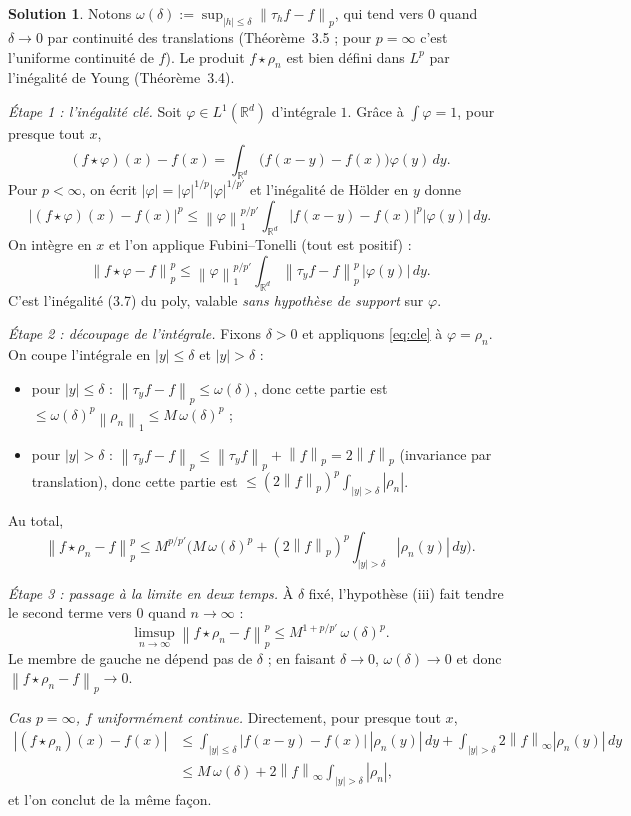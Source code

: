 \documentclass[11pt,a4paper]{article}
\newcommand{\R}{\mathbb{R}}
\newcommand{\norm}[1]{\left\|#1\right\|}
\theoremstyle{definition}
\newtheorem*{solution}{Solution}
\begin{document}
\begin{solution}
Notons $\omega(\delta):=\sup_{|h|\le\delta}\norm{\tau_hf-f}_p$, qui tend vers $0$ quand $\delta\to0$ par continuité des translations (Théorème~3.5 ; pour $p=\infty$ c'est l'uniforme continuité de $f$). Le produit $f\star\rho_n$ est bien défini dans $L^p$ par l'inégalité de Young (Théorème~3.4).

\emph{Étape 1 : l'inégalité clé.} Soit $\varphi\in L^1(\R^d)$ d'intégrale $1$. Grâce à $\int\varphi=1$, pour presque tout $x$,
\[
(f\star\varphi)(x)-f(x)=\int_{\R^d}\big(f(x-y)-f(x)\big)\varphi(y)\,dy .
\]
Pour $p<\infty$, on écrit $|\varphi|=|\varphi|^{1/p}|\varphi|^{1/p'}$ et l'inégalité de Hölder en $y$ donne
\[
\big|(f\star\varphi)(x)-f(x)\big|^p\le\norm\varphi_1^{p/p'}\int_{\R^d}\big|f(x-y)-f(x)\big|^p|\varphi(y)|\,dy .
\]
On intègre en $x$ et l'on applique Fubini--Tonelli (tout est positif) :
\begin{equation}\label{eq:cle}
\norm{f\star\varphi-f}_p^p\le\norm\varphi_1^{p/p'}\int_{\R^d}\norm{\tau_yf-f}_p^p\,|\varphi(y)|\,dy .
\end{equation}
C'est l'inégalité (3.7) du poly, valable \emph{sans hypothèse de support} sur $\varphi$.

\emph{Étape 2 : découpage de l'intégrale.} Fixons $\delta>0$ et appliquons \eqref{eq:cle} à $\varphi=\rho_n$. On coupe l'intégrale en $|y|\le\delta$ et $|y|>\delta$ :
\begin{itemize}
  \item pour $|y|\le\delta$ : $\norm{\tau_yf-f}_p\le\omega(\delta)$, donc cette partie est $\le\omega(\delta)^p\norm{\rho_n}_1\le M\,\omega(\delta)^p$ ;
  \item pour $|y|>\delta$ : $\norm{\tau_yf-f}_p\le\norm{\tau_yf}_p+\norm f_p=2\norm f_p$ (invariance par translation), donc cette partie est $\le(2\norm f_p)^p\int_{|y|>\delta}|\rho_n|$.
\end{itemize}
Au total,
\[
\norm{f\star\rho_n-f}_p^p\le M^{p/p'}\Big(M\,\omega(\delta)^p+(2\norm f_p)^p\int_{|y|>\delta}|\rho_n(y)|\,dy\Big).
\]

\emph{Étape 3 : passage à la limite en deux temps.} À $\delta$ fixé, l'hypothèse (iii) fait tendre le second terme vers $0$ quand $n\to\infty$ :
\[
\limsup_{n\to\infty}\norm{f\star\rho_n-f}_p^p\le M^{1+p/p'}\,\omega(\delta)^p .
\]
Le membre de gauche ne dépend pas de $\delta$ ; en faisant $\delta\to0$, $\omega(\delta)\to0$ et donc $\norm{f\star\rho_n-f}_p\to0$.

\emph{Cas $p=\infty$, $f$ uniformément continue.} Directement, pour presque tout $x$,
\begin{align*}
|(f\star\rho_n)(x)-f(x)|
&\le\int_{|y|\le\delta}|f(x-y)-f(x)|\,|\rho_n(y)|\,dy+\int_{|y|>\delta}2\norm f_\infty|\rho_n(y)|\,dy\\
&\le M\,\omega(\delta)+2\norm f_\infty\int_{|y|>\delta}|\rho_n| ,
\end{align*}
et l'on conclut de la même façon.
\end{solution}
\end{document}
